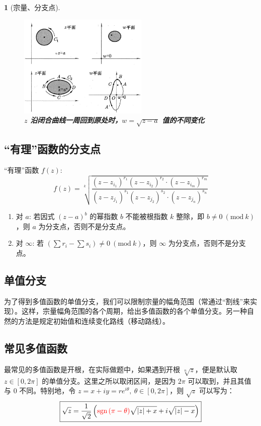 \documentclass[UTF8]{report}
\theoremstyle{MyLineTheoremStyle} %
\theoremstyle{MyBlockTheoremStyle} %
\theoremstyle{MySubsubsectionStyle} %
\newtheorem{definition}{}
\begin{document}
\begin{definition}[宗量、分支点]
\begin{figure}[H]\centering
\includegraphics[width=0.55\textwidth]{assets/1,2/image (43).jpg}
\caption{\textbf{$z$ 沿闭合曲线一周回到原处时，$w = \sqrt{z-a}$ 值的不同变化}}\label{沿闭合曲线一周回到原处时}
\end{figure}
\end{definition}

\subsection{“有理”函数的分支点}
“有理”函数 $f(z)$: 
\begin{equation}
f(z) = \sqrt[k]{
    \frac{
        (z - z_{i_1})^{r_1}(z - z_{i_2})^{r_2} \cdot (z - z_{i_m})^{r_m}
    }{
        (z - z_{j_1})^{s_1}(z - z_{j_2})^{s_2} \cdot (z - z_{j_n})^{s_n}
    }
}
\end{equation}

\begin{enumerate}
\item 对 $a$: 若因式 $(z - a)^b$ 的幂指数 $b$ {\color{red} 不能}被根指数 $k$ 整除，即 $ b \ne 0\ (\text{mod}\  k) $，则 $a$ 为分支点，否则不是分支点。
\item 对 $\infty$: 若 $(\sum r_i - \sum s_i) \ne 0\ (\text{mod}\  k)$，则 $\infty$ 为分支点，否则不是分支点。
\end{enumerate}

\subsection{单值分支}
为了得到多值函数的单值分支，我们可以限制宗量的幅角范围（常通过“割线”来实现）。这样，宗量幅角范围的各个周期，给出多值函数的各个单值分支。另一种自然的方法是规定初始值和连续变化路线（移动路线）。

\subsection{常见多值函数}
最常见的多值函数是开根，在实际做题中，如果遇到开根 $\sqrt[n]{z} $，便是默认取 $z \in [0, 2\pi]$ 的单值分支。这里之所以取闭区间，是因为 $2\pi$ 可以取到，并且其值与 $0$ 不同。特别地，令 $z = x + iy = re^{i \theta},\ \theta \in [0, 2\pi]$，则 $\sqrt{z}$ 可以写为：
\begin{equation}
\boxed{
    \sqrt{z} =  \frac{1}{\sqrt{2}} \left( {\color{red} \text{sgn\,}(\pi -\theta)} \sqrt{| z | + x} + i \sqrt{| z | - x}  \right)
}
\end{equation}
\end{document}
